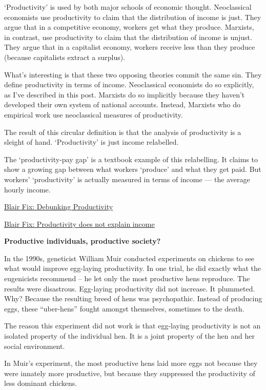 \documentclass[
]{book}
\begin{document}
`Productivity' is used by both major schools of economic thought. Neoclassical economists use productivity to claim that the distribution of income is just. They argue that in a competitive economy, workers get what they produce. Marxists, in contrast, use productivity to claim that the distribution of income is unjust. They argue that in a capitalist economy, workers receive less than they produce (because capitalists extract a surplus).

What's interesting is that these two opposing theories commit the same sin. They define productivity in terms of income. Neoclassical economists do so explicitly, as I've described in this post. Marxists do so implicitly because they haven't developed their own system of national accounts. Instead, Marxists who do empirical work use neoclassical measures of productivity.

The result of this circular definition is that the analysis of productivity is a sleight of hand. `Productivity' is just income relabelled.

The `productivity-pay gap' is a textbook example of this relabelling. It claims to show a growing gap between what workers `produce' and what they get paid. But workers' `productivity' is actually measured in terms of income --- the average hourly income.

\href{https://economicsfromthetopdown.com/2020/01/17/debunking-the-productivity-pay-gap/amp/}{Blair Fix: Debunking Productivity}

\href{https://evonomics.com/no-productivity-does-not-explain-income/}{Blair Fix: Productivity does not explain income}

\textbf{Productive individuals, productive society?}

In the 1990s, geneticist William Muir conducted experiments on chickens to see what would
improve egg-laying productivity.
In one trial, he did exactly what the eugenicists recommend -- he let only the most productive hens
reproduce. The results were disastrous. Egg-laying productivity did not increase.
It plummeted. Why? Because the resulting breed of hens was psychopathic.
Instead of producing eggs, these ``uber-hens'' fought amongst themselves, sometimes to the death.

The reason this experiment did not work is that egg-laying productivity is not an isolated
property of the individual hen.
It is a joint property of the hen and her social environment.

In Muir's experiment, the most productive hens laid more eggs not because they were innately
more productive, but because they suppressed the productivity of less dominant chickens.
\end{document}

